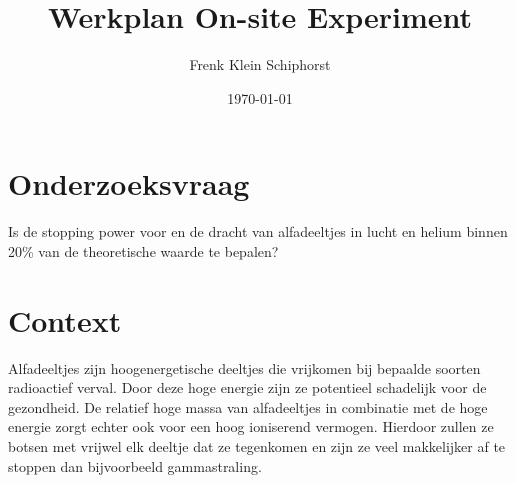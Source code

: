\documentclass[11pt,a4paper]{article}
\author{Frenk Klein Schiphorst} %
\title{Werkplan On-site Experiment} %
\date{\today}
\begin{document}
\suppressfloats[t]      %


\section{Onderzoeksvraag}
Is de stopping power voor en de dracht van alfadeeltjes in lucht en helium binnen 20\% van de theoretische waarde te bepalen?

\section{Context}
Alfadeeltjes zijn hoogenergetische deeltjes die vrijkomen bij bepaalde soorten radioactief verval. Door deze hoge energie zijn ze potentieel schadelijk voor de gezondheid. De relatief hoge massa van alfadeeltjes in combinatie met de hoge energie zorgt echter ook voor een hoog ioniserend vermogen. Hierdoor zullen ze botsen met vrijwel elk deeltje dat ze tegenkomen en zijn ze veel makkelijker af te stoppen dan bijvoorbeeld gammastraling.
\end{document}
